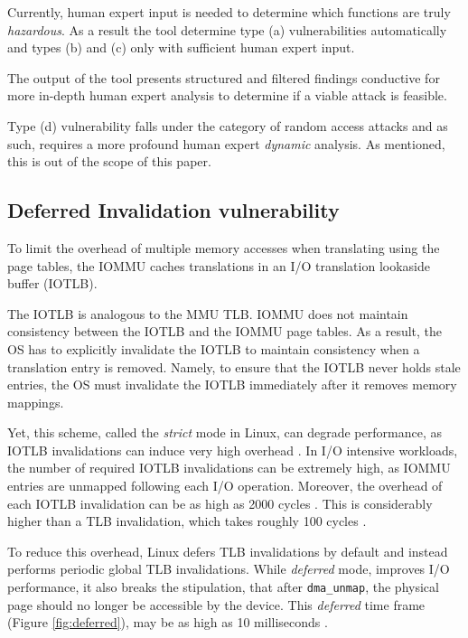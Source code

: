 Currently, human expert input is needed to determine which functions are truly \emph{hazardous}. As a result the tool determine type (a) vulnerabilities automatically and types (b) and (c) only with sufficient human expert input. 

The output of the tool presents structured and filtered findings conductive for more in-depth human expert analysis to determine if a viable attack is feasible. 

Type (d) vulnerability falls under the category of random access attacks and as such, requires a more profound human expert \emph{dynamic} analysis. As mentioned, this is out of the scope of this paper.


\subsection{Deferred Invalidation vulnerability}\label{sec:deferred}

To limit the overhead of multiple memory accesses when translating \iova{} using the page tables, the IOMMU caches translations in an I/O translation lookaside buffer (IOTLB). 

The IOTLB is analogous to the MMU TLB. IOMMU does not maintain consistency between the IOTLB and the IOMMU page tables. As a result, the OS has to explicitly invalidate the IOTLB to maintain consistency when a translation entry is removed. Namely, to ensure that the IOTLB never holds stale entries, the OS must invalidate the IOTLB immediately after it removes memory mappings. 

Yet, this scheme, called the \emph{strict} mode in Linux, can degrade performance, as IOTLB invalidations can induce very high overhead \cite{MMT16,MSMT18,Peleg15}. In I/O intensive workloads, the number of required IOTLB invalidations can be extremely high, as IOMMU entries are unmapped following each I/O operation. Moreover, the overhead of each IOTLB invalidation can be as high as 2000 cycles \cite{ABYTS11}. This is considerably higher than a TLB invalidation, which takes roughly 100 cycles \cite{Han14}. 

To reduce this overhead, Linux defers TLB invalidations by default and instead performs periodic global TLB invalidations. While \emph{deferred} mode, improves I/O performance, it also breaks the stipulation, that after \texttt{dma\_unmap}, the physical page should no longer be accessible by the device. This \emph{deferred} time frame (Figure \ref{fig:deferred}), may be as high as 10 milliseconds \cite{MSMT18}.

